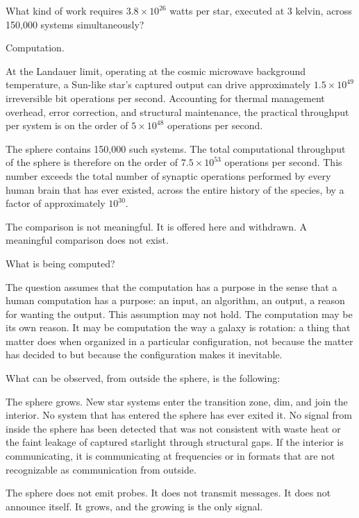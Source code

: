 What kind of work requires $3.8 \times 10^{26}$ watts per star, executed at 3 kelvin, across 150,000 systems simultaneously?

Computation.

At the Landauer limit, operating at the cosmic microwave background temperature, a Sun-like star's captured output can drive approximately $1.5 \times 10^{49}$ irreversible bit operations per second. Accounting for thermal management overhead, error correction, and structural maintenance, the practical throughput per system is on the order of $5 \times 10^{48}$ operations per second.

The sphere contains 150,000 such systems. The total computational throughput of the sphere is therefore on the order of $7.5 \times 10^{53}$ operations per second. This number exceeds the total number of synaptic operations performed by every human brain that has ever existed, across the entire history of the species, by a factor of approximately $10^{30}$.

The comparison is not meaningful. It is offered here and withdrawn. A meaningful comparison does not exist.

\bigskip

What is being computed?

The question assumes that the computation has a purpose in the sense that a human computation has a purpose: an input, an algorithm, an output, a reason for wanting the output. This assumption may not hold. The computation may be its own reason. It may be computation the way a galaxy is rotation: a thing that matter does when organized in a particular configuration, not because the matter has decided to but because the configuration makes it inevitable.

What can be observed, from outside the sphere, is the following:

The sphere grows. New star systems enter the transition zone, dim, and join the interior. No system that has entered the sphere has ever exited it. No signal from inside the sphere has been detected that was not consistent with waste heat or the faint leakage of captured starlight through structural gaps. If the interior is communicating, it is communicating at frequencies or in formats that are not recognizable as communication from outside.

The sphere does not emit probes. It does not transmit messages. It does not announce itself. It grows, and the growing is the only signal.

\bigskip

